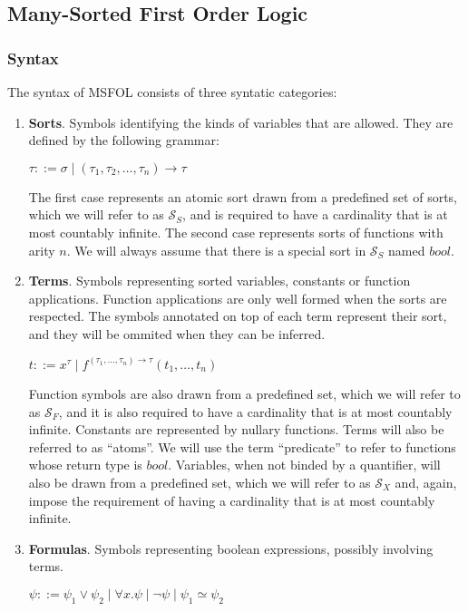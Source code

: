 \subsection{Many-Sorted First Order Logic}\label{sec:msfolHere}
\subsubsection{Syntax}

The syntax of MSFOL consists of three syntatic categories:

\begin{enumerate}
  \item \textbf{Sorts}. Symbols identifying the kinds of variables that are allowed. They are defined by the following grammar:
        \begin{center}
          $ \tau ::= \sigma \mid (\tau_{1}, \tau_{2}, \ldots, \tau_{n}) \rightarrow \tau$ %
        \end{center}
        The first case represents an atomic sort drawn from a predefined set of sorts, which we will refer to as $\mathcal{S}_{S}$, and is required to have a cardinality that is at most countably infinite. The second case represents sorts of functions with arity $n$. We will always assume that there is a special sort in $\mathcal{S}_{S}$ named $\textit{bool}$.
  \item \textbf{Terms}. Symbols representing sorted variables, constants or function applications. Function applications are only well formed when the sorts are respected. The symbols annotated on top of each term represent their sort, and they will be ommited when they can be inferred.
        \begin{center}
          $ t ::= x^{\tau} \mid f^{(\tau_{1}, \ldots, \tau_{n}) \rightarrow \tau}(t_{1}, \dots, t_{n}) $
        \end{center}
        Function symbols are also drawn from a predefined set, which we will refer to as $\mathcal{S}_{F}$, and it is also required to have a cardinality that is at most countably infinite. Constants are represented by nullary functions. Terms will also be referred to as ``atoms''. We will use the term ``predicate'' to refer to functions whose return type is $\textit{bool}$. Variables, when not binded by a quantifier, will also be drawn from a predefined set, which we will refer to as $\mathcal{S}_{X}$ and, again, impose the requirement of having a cardinality that is at most countably infinite.
  \item \textbf{Formulas}. Symbols representing boolean expressions, possibly involving terms.
        \begin{center}
          $ \psi ::= \psi_{1} \vee \psi_{2} \mid \forall x.\psi \mid \neg \psi \mid \psi_{1} \simeq \psi_{2}$
        \end{center}
\end{enumerate}

